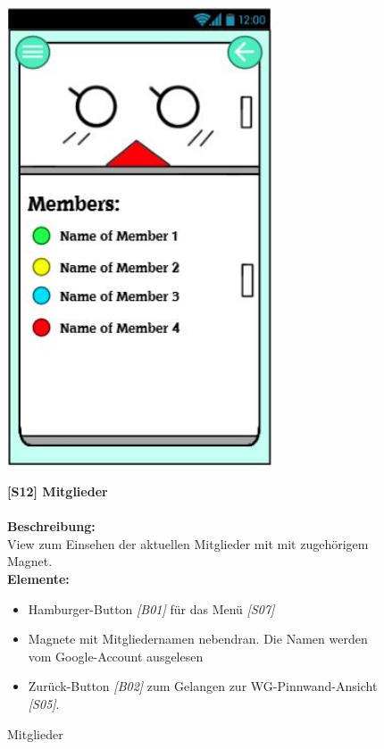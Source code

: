 \documentclass[a4paper]{scrreprt}
\begin{document}
    	\begin{figure}[h!]
    		\begin{minipage}[t]{0.35\linewidth}
    			\flushright
    			\centering
    			\vspace{9mm}
    			\includegraphics[width=0.7\textwidth]{fridget_members.JPG}
    			\caption{Mitglieder}
    			\label{fig:figure1}
    		\end{minipage}
    		\hspace{0.5cm}
    		\begin{minipage}[t]{0.65\linewidth}
    			\flushleft
    			\vspace{9mm}
    			\textbf{{[}S12{]} Mitglieder} \\
    			\hfill
    			\\
    			\textbf{Beschreibung:} \\
    			View zum Einsehen der aktuellen Mitglieder mit
    			mit zugehörigem Magnet.\\
    			\hfill
    			\textbf{Elemente:}\\
    			\begin{itemize}
    				\renewcommand\labelitemi{--}
    				\item Hamburger-Button \textit{{[}B01{]}} für das Menü \textit{{[}S07{]}}
    				\item Magnete mit Mitgliedernamen nebendran.
    				Die Namen werden vom Google-Account
    				ausgelesen
    				\item Zurück-Button \textit{{[}B02{]}} zum Gelangen zur
    				WG-Pinnwand-Ansicht \textit{{[}S05{]}}.
    				

\end{itemize}
\end{minipage}
\end{figure}
\end{document}
